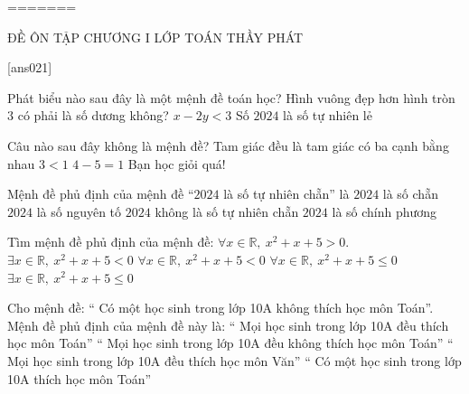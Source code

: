 
=======
\begin{name}
	{\tenchude}
	{ĐỀ ÔN TẬP CHƯƠNG I}
	{LỚP TOÁN THẦY PHÁT}
	{\thoigian}
\end{name}
\TN
\setcounter{ex}{0}
[ans021]


\begin{ex}
	Phát biểu nào sau đây là một mệnh đề toán học?
	\choice
	{Hình vuông đẹp hơn hình tròn}
	{$3$ có phải là số dương không?}
	{$x-2y<3$}
	{\True Số $2024$ là số tự nhiên lẻ}
\end{ex}

\begin{ex}
	Câu nào sau đây không là mệnh đề?
	\choice
	{Tam giác đều là tam giác có ba cạnh bằng nhau}
	{$3<1$}
	{$4-5=1$}
	{\True Bạn học giỏi quá!}
\end{ex}

\begin{ex}
	Mệnh đề phủ định của mệnh đề “$2024$ là số tự nhiên chẵn” là
	\choice
	{$2024$ là số chẵn}
	{$2024$ là số nguyên tố}
	{\True $2024$ không là số tự nhiên chẵn}
	{$2024$ là số chính phương}
\end{ex}

\begin{ex}
	Tìm mệnh đề phủ định của mệnh đề: $\forall x\in \mathbb{R}, \ x^2+x+5>0$.
	\choice
	{$\exists x\in \mathbb{R}, \ x^2+x+5<0$}
	{$\forall x\in \mathbb{R}, \ x^2+x+5<0$}
	{$\forall x\in \mathbb{R}, \ x^2+x+5\leqslant 0$}
	{\True $\exists x\in \mathbb{R}, \ x^2+x+5\leqslant 0$}
\end{ex}

\begin{ex}
	Cho mệnh đề: “ Có một học sinh trong lớp 10A không thích học môn Toán”. Mệnh đề phủ định của mệnh đề này là:
	\choice
	{\True “ Mọi học sinh trong lớp 10A đều thích học môn Toán”}
	{“ Mọi học sinh trong lớp 10A đều không thích học môn Toán”}
	{“ Mọi học sinh trong lớp 10A đều thích học môn Văn”}
	{“ Có một học sinh trong lớp 10A thích học môn Toán”}
\end{ex}

